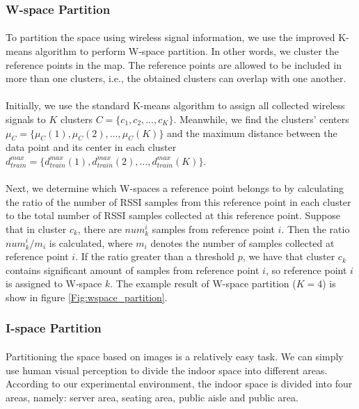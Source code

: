 \documentclass[a4paper,12pt]{report}
\begin{document}
\subsubsection{W-space Partition}
\paragraph{}
To partition the space using wireless signal information, we use the improved K-means algorithm \cite{zhang2020received} to perform W-space partition. In other words, we cluster the reference points in the map. The reference points are allowed to be included in more than one clusters, i.e., the obtained clusters can overlap with one another.
\paragraph{}
Initially, we use the standard K-means algorithm to assign all collected wireless signals to $K$ clusters $C=\{c_1,c_2,\dots,c_K\}$. Meanwhile, we find the clusters' centers $\mu_C=\{\mu_C(1),\mu_C(2),\dots,\mu_C(K)\}$ and the maximum distance between the data point and its center in each cluster $d_{train}^{max}=\{d_{train}^{max}(1),d_{train}^{max}(2),\dots,d_{train}^{max}(K)\}$.
\paragraph{}
Next, we determine which W-spaces a reference point belongs to by calculating the ratio of the number of RSSI samples from this reference point in each cluster to the total number of RSSI samples collected at this reference point. Suppose that in cluster $c_k$, there are $num_k^i$ samples from reference point $i$. Then the ratio $num_k^i/m_i$ is calculated, where $m_i$ denotes the number of samples collected at reference point $i$. If the ratio greater than a threshold $p$, we have that cluster $c_k$ contains significant amount of samples from reference point $i$, so reference point $i$ is assigned to W-space $k$. The example result of W-space partition ($K=4$) is show in figure \ref{Fig:wspace_partition}.

\subsubsection{I-space Partition}
\paragraph{}
Partitioning the space based on images is a relatively easy task. We can simply use human visual perception to divide the indoor space into different areas. According to our experimental environment, the indoor space is divided into four areas, namely: server area, seating area, public aisle and public area. 
\end{document}
